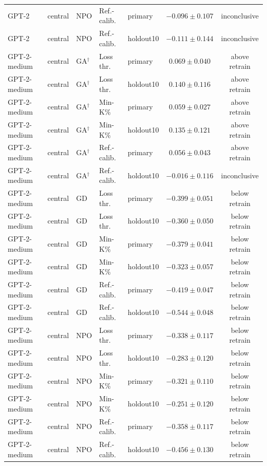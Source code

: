 {\begin{longtable}{@{\extracolsep{\fill}}lllllcc@{}}
GPT-2 & central & NPO & Ref.-calib. & primary & $-0.096 \pm 0.107$ & inconclusive \\
GPT-2 & central & NPO & Ref.-calib. & holdout10 & $-0.111 \pm 0.144$ & inconclusive \\
GPT-2-medium & central & GA$^{\dagger}$ & Loss thr. & primary & $0.069 \pm 0.040$ & above retrain \\
GPT-2-medium & central & GA$^{\dagger}$ & Loss thr. & holdout10 & $0.140 \pm 0.116$ & above retrain \\
GPT-2-medium & central & GA$^{\dagger}$ & Min-K\% & primary & $0.059 \pm 0.027$ & above retrain \\
GPT-2-medium & central & GA$^{\dagger}$ & Min-K\% & holdout10 & $0.135 \pm 0.121$ & above retrain \\
GPT-2-medium & central & GA$^{\dagger}$ & Ref.-calib. & primary & $0.056 \pm 0.043$ & above retrain \\
GPT-2-medium & central & GA$^{\dagger}$ & Ref.-calib. & holdout10 & $-0.016 \pm 0.116$ & inconclusive \\
GPT-2-medium & central & GD & Loss thr. & primary & $-0.399 \pm 0.051$ & below retrain \\
GPT-2-medium & central & GD & Loss thr. & holdout10 & $-0.360 \pm 0.050$ & below retrain \\
GPT-2-medium & central & GD & Min-K\% & primary & $-0.379 \pm 0.041$ & below retrain \\
GPT-2-medium & central & GD & Min-K\% & holdout10 & $-0.323 \pm 0.057$ & below retrain \\
GPT-2-medium & central & GD & Ref.-calib. & primary & $-0.419 \pm 0.047$ & below retrain \\
GPT-2-medium & central & GD & Ref.-calib. & holdout10 & $-0.544 \pm 0.048$ & below retrain \\
GPT-2-medium & central & NPO & Loss thr. & primary & $-0.338 \pm 0.117$ & below retrain \\
GPT-2-medium & central & NPO & Loss thr. & holdout10 & $-0.283 \pm 0.120$ & below retrain \\
GPT-2-medium & central & NPO & Min-K\% & primary & $-0.321 \pm 0.110$ & below retrain \\
GPT-2-medium & central & NPO & Min-K\% & holdout10 & $-0.251 \pm 0.120$ & below retrain \\
GPT-2-medium & central & NPO & Ref.-calib. & primary & $-0.358 \pm 0.117$ & below retrain \\
GPT-2-medium & central & NPO & Ref.-calib. & holdout10 & $-0.456 \pm 0.130$ & below retrain \\

\end{longtable}}
